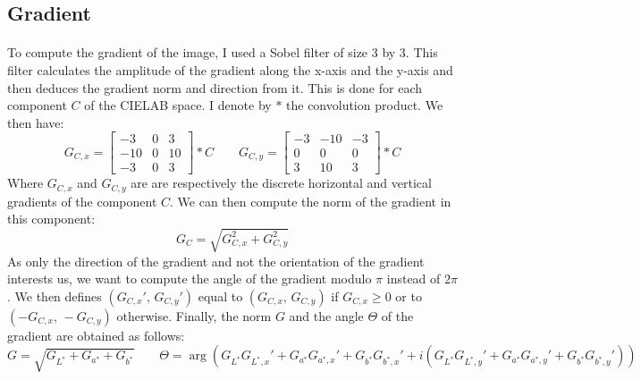 \documentclass[11pt]{article}
\begin{document}
	\subsection{Gradient}
	
	\paragraph{}
	To compute the gradient of the image, I used a Sobel filter of size $3$ by $3$. This filter calculates the amplitude of the gradient along the x-axis and the y-axis and then deduces the gradient norm and direction from it. This is done for each component $C$ of the CIELAB space. I denote by $\ast$ the convolution product. We then have:
	$$ G_{C, x} = \begin{bmatrix} -3 & 0 & 3 \\ -10 & 0 & 10 \\ -3 & 0 & 3 \end{bmatrix} \ast C
		\qquad G_{C, y} = \begin{bmatrix} -3 & -10 & -3 \\ 0 & 0 & 0 \\ 3 & 10 & 3 \end{bmatrix} \ast C
	$$
	Where $G_{C, x}$ and $G_{C, y}$ are are respectively the discrete horizontal and vertical gradients of the component $C$. We can then compute the norm of the gradient in this component:
	$$ G_C = \sqrt{G_{C, x}^2 + G_{C, y}^2} $$
	As only the direction of the gradient and not the orientation of the gradient interests us, we want to compute the angle of the gradient modulo $\pi$ instead of $2 \pi$. We then defines $(G_{C, x}', \, G_{C, y}')$ equal to $(G_{C, x}, \, G_{C, y})$ if $G_{C, x} \geqslant 0$ or to $(-G_{C, x}, \, -G_{C, y})$ otherwise. Finally, the norm $G$ and the angle $\Theta$ of the gradient are obtained as follows:
	$$ G = \sqrt{G_{L^*} + G_{a^*} + G_{b^*}} \qquad \Theta = \arg \left( G_{L^*} G_{L^*, x}' + G_{a^*} G_{a^*, x}' + G_{b^*} G_{b^*, x}' + i \left( G_{L^*} G_{L^*, y}' + G_{a^*} G_{a^*, y}' + G_{b^*} G_{b^*, y}' \right) \right)$$
	
\end{document}
